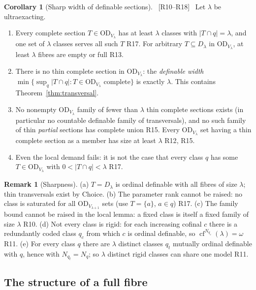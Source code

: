 \documentclass[11pt,letterpaper]{article}
\theoremstyle{definition}
\newtheorem{corollary}[definition]{Corollary}
\newtheorem{remark}[definition]{Remark}
\numberwithin{equation}{section}
\newcommand{\OD}{\mathrm{OD}}
\newcommand{\cf}{\operatorname{cf}}
\newcommand{\src}[1]{\unskip\ {\normalfont\small\sffamily\color{Olive}[#1]}\ }
\newcommand{\R}[1]{\textsf{R#1}}
\begin{document}
\begin{corollary}[Sharp width of definable sections]\label{cor:sharpwidth}\src{R10--R18}
Let $\lambda$ be ultraexacting.
\begin{enumerate}
\item Every complete section $T\in\OD_{V_\lambda}$ has at least $\lambda$ classes with $|T\cap q|=\lambda$, and one set of $\lambda$ classes serves all such $T$ \R{17}. For arbitrary $T\subseteq D_\lambda$ in $\OD_{V_\lambda}$, at least $\lambda$ fibres are empty or full \R{13}.
\item There is no thin complete section in $\OD_{V_\lambda}$: the \emph{definable width} $\min\{\sup_q|T\cap q|:T\in\OD_{V_\lambda}\text{ complete}\}$ is exactly $\lambda$. This contains Theorem~\ref{thm:transversal}.
\item No nonempty $\OD_{V_\lambda}$ family of fewer than $\lambda$ thin complete sections exists (in particular no countable definable family of transversals), and no such family of thin \emph{partial} sections has complete union \R{15}. Every $\OD_{V_\lambda}$ set having a thin complete section as a member has size at least $\lambda$ \R{12}, \R{15}.
\item Even the local demand fails: it is not the case that every class $q$ has some $T\in\OD_{V_\lambda}$ with $0<|T\cap q|<\lambda$ \R{17}.
\end{enumerate}
\end{corollary}

\begin{remark}[Sharpness]\label{rem:sharpquot}
(a) $T=D_\lambda$ is ordinal definable with all fibres of size $\lambda$; thin transversals exist by Choice. (b) The parameter rank cannot be raised: no class is saturated for all $\OD_{V_{\lambda+1}}$ sets (use $T=\{a\}$, $a\in q$) \R{17}. (c) The family bound cannot be raised in the local lemma: a fixed class is itself a fixed family of size $\lambda$ \R{10}. (d) Not every class is rigid: for each increasing cofinal $c$ there is a redundantly coded class $q_c$ from which $c$ is ordinal definable, so $\cf^{N_{q_c}}(\lambda)=\omega$ \R{11}. (e) For every class $q$ there are $\lambda$ distinct classes $q_t$ mutually ordinal definable with $q$, hence with $N_{q_t}=N_q$; so $\lambda$ distinct rigid classes can share one model \R{11}.
\end{remark}

\subsection{The structure of a full fibre}
\end{document}
